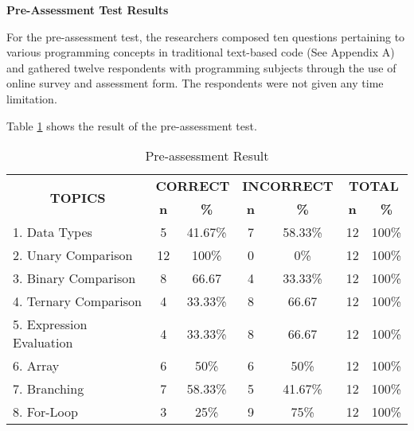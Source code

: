 \flushleft
\textbf{Pre-Assessment Test Results}
\justifying

\parx
For the pre-assessment test, the researchers composed ten questions pertaining
to various programming concepts in traditional text-based code (See Appendix A)
and gathered twelve respondents with programming subjects through the use of
online survey and assessment form. The respondents were not given any time
limitation.

\parx
Table \ref{table:pre_result} shows the result of the pre-assessment test.

\begin{longtable}[c]{lcccccc}
\caption{Pre-assessment Result}
\label{table:pre_result}\\ \hline
\multicolumn{1}{c}{\multirow{2}{*}{\textbf{TOPICS}}} & \multicolumn{2}{c}{\textbf{CORRECT}} & \multicolumn{2}{c}{\textbf{INCORRECT}} & \multicolumn{2}{c}{\textbf{TOTAL}} \\
\multicolumn{1}{c}{}                                 & \textbf{n}       & \textbf{\%}       & \textbf{n}        & \textbf{\%}        & \textbf{n}      & \textbf{\%}      \\ \hline
\endfirsthead
%
\endhead
%
1. Data Types                                        & 5                & 41.67\%           & 7                 & 58.33\%            & 12              & 100\%            \\
2. Unary Comparison                                  & 12               & 100\%             & 0                 & 0\%                & 12              & 100\%            \\
3. Binary Comparison                                 & 8                & 66.67             & 4                 & 33.33\%            & 12              & 100\%            \\
4. Ternary Comparison                                & 4                & 33.33\%           & 8                 & 66.67              & 12              & 100\%            \\
5. Expression Evaluation                             & 4                & 33.33\%           & 8                 & 66.67              & 12              & 100\%            \\
6. Array                                             & 6                & 50\%              & 6                 & 50\%               & 12              & 100\%            \\
7. Branching                                         & 7                & 58.33\%           & 5                 & 41.67\%            & 12              & 100\%            \\
8. For-Loop                                         & 3                & 25\%              & 9                 & 75\%               & 12              & 100\%           \\ \hline
\end{longtable}

